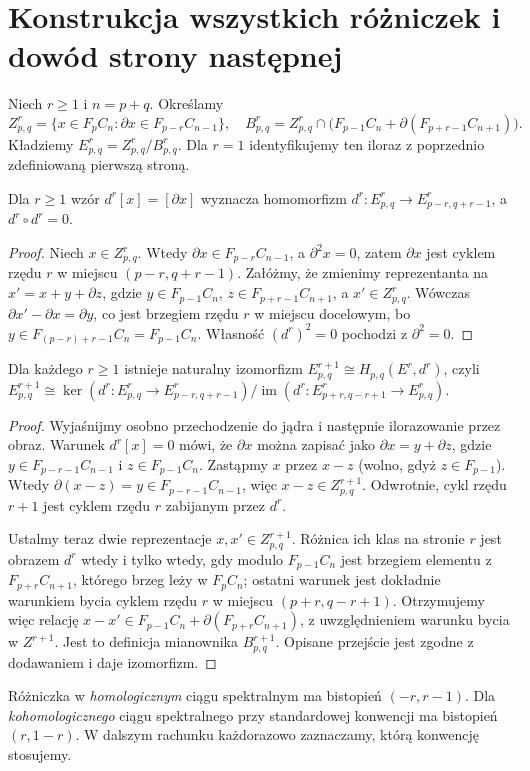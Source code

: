 \section{Konstrukcja wszystkich różniczek i dowód strony następnej}
\begin{definicja}
Niech $r\ge1$ i $n=p+q$. Określamy
\[
Z^r_{p,q}=\{x\in F_pC_n:\partial x\in F_{p-r}C_{n-1}\},
\quad
B^r_{p,q}=Z^r_{p,q}\cap\bigl(F_{p-1}C_n+\partial(F_{p+r-1}C_{n+1})\bigr).
\]
Kładziemy $E^r_{p,q}=Z^r_{p,q}/B^r_{p,q}$.
Dla $r=1$ identyfikujemy ten iloraz z poprzednio zdefiniowaną
pierwszą stroną.
\end{definicja}
\begin{lemat}
\label{lem:dr-v5}
Dla $r\ge1$ wzór $d^r[x]=[\partial x]$ wyznacza
homomorfizm
$d^r:E^r_{p,q}\to E^r_{p-r,q+r-1}$,
a $d^r\circ d^r=0$.
\end{lemat}
\begin{proof}
Niech $x\in Z^r_{p,q}$. Wtedy $\partial x\in F_{p-r}C_{n-1}$,
a $\partial^2x=0$, zatem $\partial x$ jest cyklem
rzędu $r$ w miejscu $(p-r,q+r-1)$. Załóżmy, że zmienimy
reprezentanta na $x'=x+y+\partial z$, gdzie
$y\in F_{p-1}C_n$, $z\in F_{p+r-1}C_{n+1}$,
a $x'\in Z^r_{p,q}$. Wówczas
$\partial x'-\partial x=\partial y$,
co jest brzegiem rzędu $r$ w miejscu docelowym, bo
$y\in F_{(p-r)+r-1}C_n=F_{p-1}C_n$.
Własność $(d^r)^2=0$ pochodzi z $\partial^2=0$.
\end{proof}
\begin{twierdzenie}
\label{thm:pages-v5}
Dla każdego $r\ge1$ istnieje naturalny izomorfizm
$E^{r+1}_{p,q}\cong H_{p,q}(E^r,d^r)$, czyli
$E^{r+1}_{p,q}\cong\ker(d^r:E^r_{p,q}\to E^r_{p-r,q+r-1})/
\operatorname{im}(d^r:E^r_{p+r,q-r+1}\to E^r_{p,q})$.
\end{twierdzenie}
\begin{proof}
Wyjaśnijmy osobno przechodzenie do jądra i następnie
ilorazowanie przez obraz. Warunek $d^r[x]=0$ mówi, że
$\partial x$ można zapisać jako
$\partial x=y+\partial z$, gdzie
$y\in F_{p-r-1}C_{n-1}$ i $z\in F_{p-1}C_n$.
Zastąpmy $x$ przez $x-z$ (wolno, gdyż $z\in F_{p-1}$).
Wtedy $\partial(x-z)=y\in F_{p-r-1}C_{n-1}$,
więc $x-z\in Z^{r+1}_{p,q}$. Odwrotnie, cykl rzędu $r+1$
jest cyklem rzędu $r$ zabijanym przez $d^r$.

Ustalmy teraz dwie reprezentacje $x,x'\in Z^{r+1}_{p,q}$.
Różnica ich klas na stronie $r$ jest obrazem $d^r$
wtedy i tylko wtedy, gdy modulo $F_{p-1}C_n$ jest
brzegiem elementu z $F_{p+r}C_{n+1}$, którego brzeg
leży w $F_pC_n$; ostatni warunek jest dokładnie
warunkiem bycia cyklem rzędu $r$ w miejscu $(p+r,q-r+1)$.
Otrzymujemy więc relację
$x-x'\in F_{p-1}C_n+\partial(F_{p+r}C_{n+1})$,
z uwzględnieniem warunku bycia w $Z^{r+1}$.
Jest to definicja mianownika $B^{r+1}_{p,q}$.
Opisane przejście jest zgodne z dodawaniem i daje izomorfizm.
\end{proof}
\begin{uwaga}
Różniczka w \emph{homologicznym} ciągu spektralnym ma
bistopień $(-r,r-1)$. Dla \emph{kohomologicznego} ciągu
spektralnego przy standardowej konwencji ma bistopień
$(r,1-r)$. W dalszym rachunku każdorazowo zaznaczamy,
którą konwencję stosujemy.
\end{uwaga}

